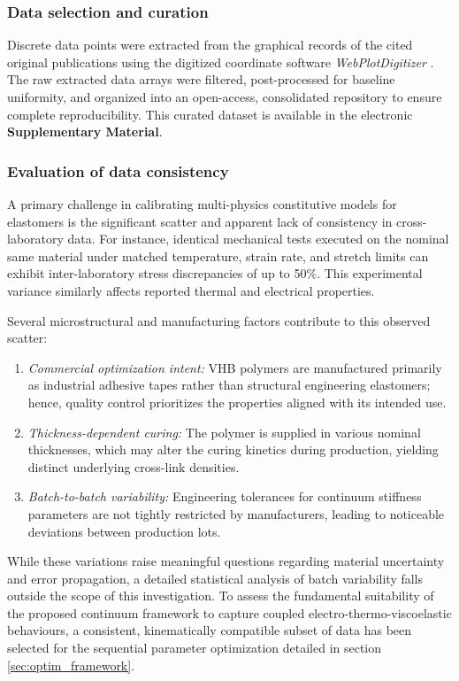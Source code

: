 \subsubsection{Data selection and curation}
\label{subsubsec:data_curation}

Discrete data points were extracted from the graphical records of the cited original publications using the digitized coordinate software \textit{WebPlotDigitizer} \cite{webplotdigitizer}. The raw extracted data arrays were filtered, post-processed for baseline uniformity, and organized into an open-access, consolidated repository to ensure complete reproducibility. This curated dataset is available in the electronic \textbf{Supplementary Material}.


\subsubsection{Evaluation of data consistency}
\label{subsubsec:data_consistency}

A primary challenge in calibrating multi-physics constitutive models for elastomers is the significant scatter and apparent lack of consistency in cross-laboratory data. For instance, identical mechanical tests executed on the nominal same material under matched temperature, strain rate, and stretch limits can exhibit inter-laboratory stress discrepancies of up to 50\%. This experimental variance similarly affects reported thermal and electrical properties.

Several microstructural and manufacturing factors contribute to this observed scatter:
\begin{enumerate}
    \item \emph{Commercial optimization intent:} VHB polymers are manufactured primarily as industrial adhesive tapes rather than structural engineering elastomers; hence, quality control prioritizes the properties aligned with its intended use.
    \item \emph{Thickness-dependent curing:} The polymer is supplied in various nominal thicknesses, which may alter the curing kinetics during production, yielding distinct underlying cross-link densities.
    \item \emph{Batch-to-batch variability:} Engineering tolerances for continuum stiffness parameters are not tightly restricted by manufacturers, leading to noticeable deviations between production lots.
\end{enumerate}


While these variations raise meaningful questions regarding material uncertainty and error propagation, a detailed statistical analysis of batch variability falls outside the scope of this investigation. To assess the fundamental suitability of the proposed continuum framework to capture coupled electro-thermo-viscoelastic behaviours, a consistent, kinematically compatible subset of data has been selected for the sequential parameter optimization detailed in section \ref{sec:optim_framework}.



